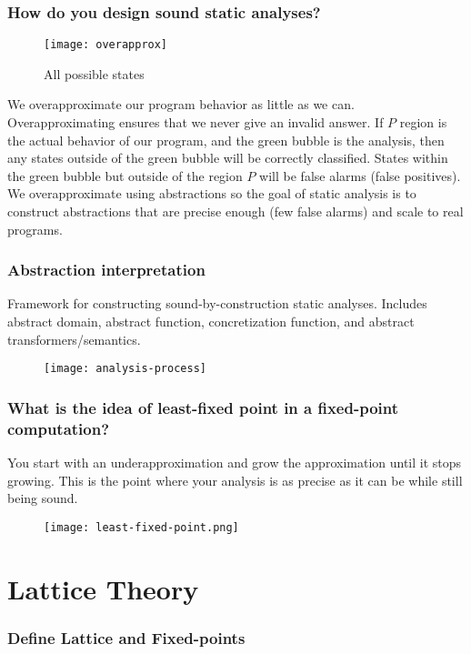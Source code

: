 \documentclass[11pt]{article}
\begin{document}
\subsubsection{How do you design sound static analyses?}
\begin{figure}[h]
    \centering
    \texttt{[image: overapprox]}
    \caption{All possible states}
\end{figure}
We overapproximate our program behavior as little as we can. Overapproximating ensures that we never give an invalid answer. If $P$ region is the actual behavior of our program, and the green bubble is the analysis, then any states outside of the green bubble will be correctly classified. States within the green bubble but outside of the region $P$ will be false alarms (false positives). We overapproximate using abstractions so the goal of static analysis is to construct abstractions that are precise enough (few false alarms) and scale to real programs.


\subsubsection{Abstraction interpretation}
Framework for constructing sound-by-construction static analyses. Includes abstract domain, abstract function, concretization function, and abstract transformers/semantics.
\begin{figure}[h]
    \centering
    \texttt{[image: analysis-process]}
\end{figure}


\subsubsection{What is the idea of least-fixed point in a fixed-point computation?}
You start with an underapproximation and grow the approximation until it stops growing. This is the point where your analysis is as precise as it can be while still being sound.
\begin{figure}[h]
    \centering
    \texttt{[image: least-fixed-point.png]}
\end{figure}

\section{Lattice Theory}
\subsubsection{Define Lattice and Fixed-points}
\end{document}
